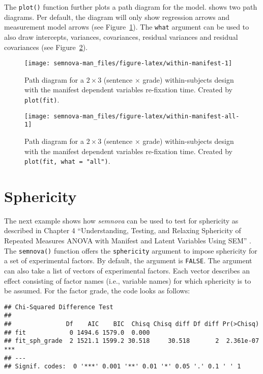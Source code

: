 \documentclass[
]{book}
\begin{document}
The \texttt{plot()} function further plots a path diagram for the model. shows two path diagrams. Per default, the diagram will only show regression arrows and measurement model arrows (see Figure~\ref{fig:within-manifest}). The \texttt{what} argument can be used to also draw intercepts, variances, covariances, residual variances and residual covariances (see Figure~\ref{fig:within-manifest-all}).

\begin{figure}

{\centering \texttt{[image: semnova-man\_files/figure-latex/within-manifest-1]} 

}

\caption{Path diagram for a $2 \times 3$ (sentence $\times$ grade) within-subjects design with the manifest dependent variables re-fixation time. Created by \texttt{plot(fit)}.}\label{fig:within-manifest}
\end{figure}

\begin{figure}

{\centering \texttt{[image: semnova-man\_files/figure-latex/within-manifest-all-1]} 

}

\caption{Path diagram for a $2 \times 3$ (sentence $\times$ grade) within-subjects design with the manifest dependent variables re-fixation time. Created by \texttt{plot(fit, what = "all")}.}\label{fig:within-manifest-all}
\end{figure}

\hypertarget{sphericity}{%
\section{Sphericity}\label{sphericity}}

The next example shows how \emph{semnova} can be used to test for sphericity as described in Chapter 4 ``Understanding, Testing, and Relaxing Sphericity of Repeated Measures ANOVA with Manifest and Latent Variables Using SEM'' \citep{Langenberg2022z}. The \texttt{semnova()} function offers the \texttt{sphericity} argument to impose sphericity for a set of experimental factors. By default, the argument is \texttt{FALSE}. The argument can also take a list of vectors of experimental factors. Each vector describes an effect consisting of factor names (i.e., variable names) for which sphericity is to be assumed. For the factor grade, the code looks as follows:

\begin{verbatim}
## Chi-Squared Difference Test
## 
##               Df    AIC    BIC  Chisq Chisq diff Df diff Pr(>Chisq)    
## fit            0 1494.6 1579.0  0.000                                  
## fit_sph_grade  2 1521.1 1599.2 30.518     30.518       2  2.361e-07 ***
## ---
## Signif. codes:  0 '***' 0.001 '**' 0.01 '*' 0.05 '.' 0.1 ' ' 1
\end{verbatim}
\end{document}
